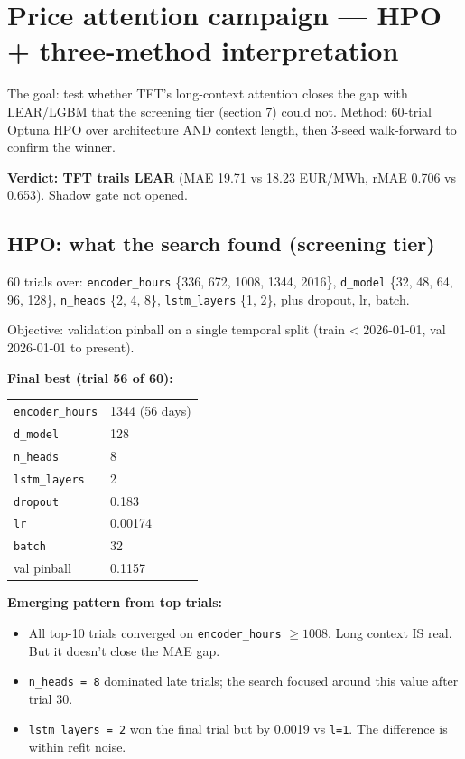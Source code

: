 \section{Price attention campaign --- HPO + three-method interpretation}

The goal: test whether TFT's long-context attention closes the gap with
LEAR/LGBM that the screening tier (section 7) could not.
Method: 60-trial Optuna HPO over architecture AND context length, then
3-seed walk-forward to confirm the winner.

\textbf{Verdict: TFT trails LEAR} (MAE 19.71 vs 18.23 EUR/MWh,
rMAE 0.706 vs 0.653). Shadow gate not opened.

\subsection{HPO: what the search found (screening tier)}

60 trials over: \texttt{encoder\_hours} \{336, 672, 1008, 1344, 2016\},
\texttt{d\_model} \{32, 48, 64, 96, 128\}, \texttt{n\_heads} \{2, 4, 8\},
\texttt{lstm\_layers} \{1, 2\}, plus dropout, lr, batch.

Objective: validation pinball on a single temporal split
(train < 2026-01-01, val 2026-01-01 to present).

\textbf{Final best (trial 56 of 60):}

\begin{center}
\begin{tabular}{ll}
\texttt{encoder\_hours} & 1344 (56 days) \\
\texttt{d\_model} & 128 \\
\texttt{n\_heads} & 8 \\
\texttt{lstm\_layers} & 2 \\
\texttt{dropout} & 0.183 \\
\texttt{lr} & 0.00174 \\
\texttt{batch} & 32 \\
val pinball & 0.1157 \\
\end{tabular}
\end{center}

\textbf{Emerging pattern from top trials:}

\begin{itemize}
  \item All top-10 trials converged on \texttt{encoder\_hours} $\geq 1008$.
        Long context IS real. But it doesn't close the MAE gap.
  \item \texttt{n\_heads = 8} dominated late trials; the search focused
        around this value after trial 30.
  \item \texttt{lstm\_layers = 2} won the final trial but by 0.0019 vs
        \texttt{l=1}. The difference is within refit noise.
\end{itemize}

